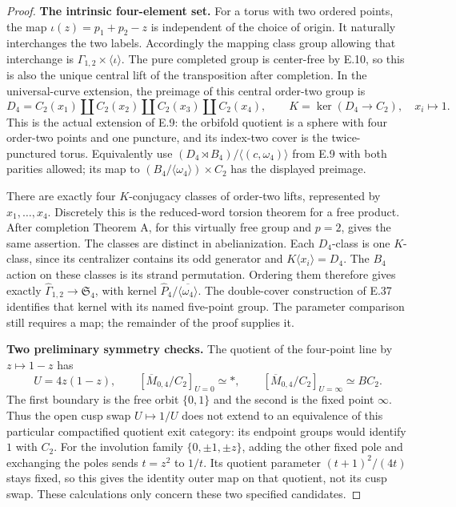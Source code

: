 \begin{proof}
\par\medskip\noindent\textbf{The intrinsic four-element set.}\quad
For a torus with two ordered points, the map
$\iota(z)=p_1+p_2-z$ is independent of the choice of origin.
It naturally interchanges the two labels.  Accordingly the
mapping class group allowing that interchange is
$\Gamma_{1,2}\times\langle\iota\rangle$.
The pure completed group is center-free by E.10, so this is also
the unique central lift of the transposition after completion.
In the universal-curve extension, the preimage of this central
order-two group is
\[
 D_4=C_2(x_1)\amalg C_2(x_2)\amalg C_2(x_3)\amalg C_2(x_4),
 \qquad K=\ker(D_4\to C_2),\quad x_i\longmapsto1.
                                                               \tag{E.210}
\]
This is the actual extension of E.9: the orbifold quotient is a
sphere with four order-two points and one puncture, and its
index-two cover is the twice-punctured torus.  Equivalently use
$(D_4\rtimes B_4)/\langle(c,\omega_4)\rangle$ from E.9 with both
parities allowed; its map to
$(B_4/\langle\omega_4\rangle)\times C_2$ has the displayed preimage.

There are exactly four $K$-conjugacy classes of order-two lifts,
represented by $x_1,\ldots,x_4$.  Discretely this is the reduced-word
torsion theorem for a free product.  After completion Theorem A,
for this virtually free group and $p=2$, gives the same assertion.
The classes are distinct in abelianization.  Each $D_4$-class is
one $K$-class, since its centralizer contains its odd generator
and $K\langle x_i\rangle=D_4$.
The $B_4$ action on these classes is its strand permutation.
Ordering them therefore gives exactly
$\widehat\Gamma_{1,2}\to\mathfrak S_4$, with kernel
$\widehat P_4/\overline{\langle\omega_4\rangle}$.
The double-cover construction of E.37 identifies that kernel
with its named five-point group.  The parameter comparison still
requires a map; the remainder of the proof supplies it.

\par\medskip\noindent\textbf{Two preliminary symmetry checks.}\quad
The quotient of the four-point line by $z\mapsto1-z$ has
\[
 U=4z(1-z),\qquad
 [\overline M_{0,4}/C_2]_{U=0}\simeq *,
 \qquad [\overline M_{0,4}/C_2]_{U=\infty}\simeq BC_2 .
                                                               \tag{E.211}
\]
The first boundary is the free orbit $\{0,1\}$ and the second
is the fixed point $\infty$.  Thus the open cusp swap
$U\mapsto1/U$ does not extend to an equivalence of this particular
compactified quotient exit category: its endpoint groups would
identify $1$ with $C_2$.
For the involution family $\{0,\pm1,\pm z\}$, adding the other
fixed pole and exchanging the poles sends $t=z^2$ to $1/t$.
Its quotient parameter $(t+1)^2/(4t)$ stays fixed, so this gives
the identity outer map on that quotient, not its cusp swap.
These calculations only concern these two specified candidates.


\end{proof}
